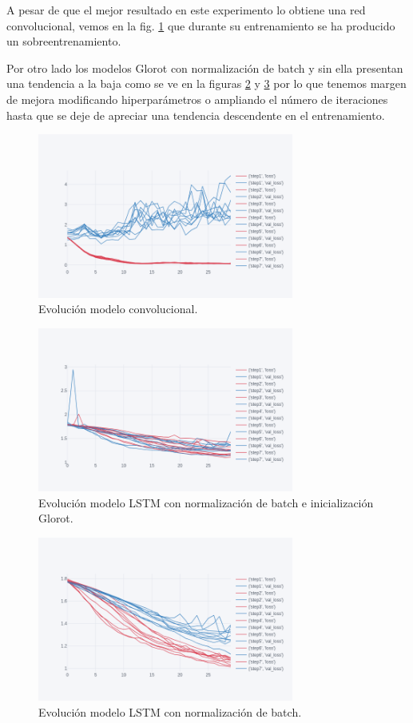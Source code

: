 A pesar de que el mejor resultado en este experimento lo obtiene una red convolucional, vemos en la fig. \ref{conv-5} que durante su entrenamiento se ha producido un sobreentrenamiento.

Por otro lado los modelos Glorot con normalización de batch y sin ella presentan una tendencia a la baja como se ve en la figuras \ref{go-5} y \ref{gn-5} por lo que tenemos margen de mejora modificando hiperparámetros o ampliando el número de iteraciones hasta que se deje de apreciar una tendencia descendente en el entrenamiento.


\begin{figure}[H]
	\centering
	\includegraphics[width=0.75\textwidth]{imaxes/conv-5-clases.png}
	\caption{Evolución modelo convolucional.}
	\label{conv-5}
\end{figure}

\begin{figure}[H]
	\centering
	\includegraphics[width=0.75\textwidth]{imaxes/go.png}
	\caption{Evolución modelo LSTM con normalización de batch e inicialización Glorot.}
	\label{go-5}
\end{figure}

\begin{figure}[H]
	\centering
	\includegraphics[width=0.75\textwidth]{imaxes/gnbn.png}
	\caption{Evolución modelo LSTM con normalización de batch.}
	\label{gn-5}
\end{figure}


